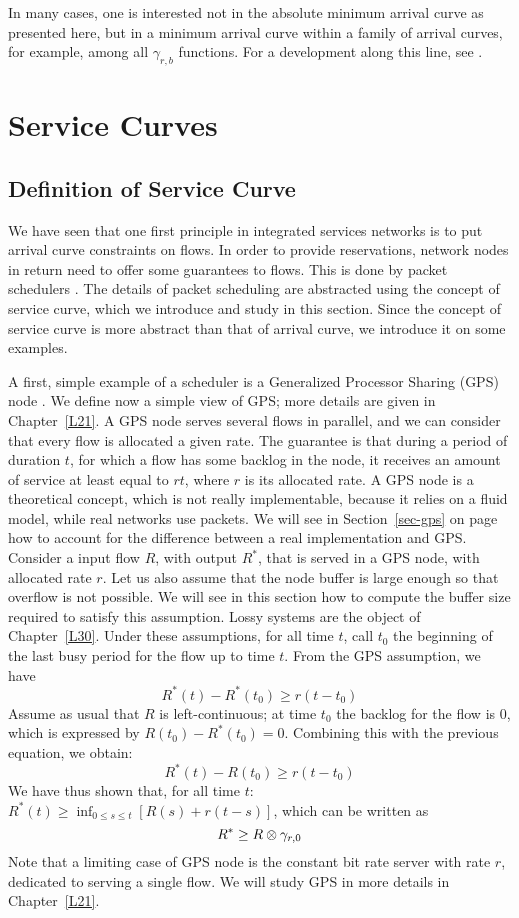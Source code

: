 In many cases, one is interested not in the absolute minimum
arrival curve as presented here, but in a minimum arrival curve
within a family of arrival curves, for example, among all
$\gamma_{r,b}$ functions. For a development along this line, see
\cite{naudts99}.


\section{Service Curves}
\subsection{Definition of Service Curve}
 We have seen that one first principle in
integrated services networks is to put arrival curve constraints
on flows. In order to provide reservations, network nodes in
return need to offer some guarantees to flows. This is done by
packet schedulers \cite{keshav-96}. The details of packet
scheduling are abstracted using the concept of service curve,
which we introduce and study in this section. Since the concept of
service curve is more abstract than that of arrival curve, we
introduce it on some examples.

A first, simple example of a scheduler is a Generalized Processor
Sharing (GPS) node \cite{pg93}. We define now a simple view of GPS; more details are
given in Chapter~\ref{L21}. A GPS node serves several flows in
parallel, and we can consider that every flow is allocated a given
rate. The guarantee is that during a period of duration $t$,  for
which a flow has some backlog in the node, it receives an amount
of service at least equal to $r t$, where $r$ is its allocated
rate. A GPS node is a theoretical concept, which is not really
implementable, because it relies on a fluid model, while real
networks use packets. We will see in Section~\ref{sec-gps} on
page~\pageref{sec-gps} how to account for the difference between a
real implementation and GPS. Consider a input flow $R$, with
output $R^*$, that is served in a GPS node, with allocated rate
$r$. Let us also assume that the node buffer is large enough so
that overflow is not possible. We will see in this section how to
compute the buffer size required to satisfy this assumption. Lossy
systems are the object of Chapter~\ref{L30}. Under these
assumptions, for all time $t$, call $t_0$ the beginning of the
last busy period for the flow up to time $t$. From the GPS
assumption, we have
$$R^{*}(t)-R^{*}(t_{0})\geq r(t-t_{0})$$
Assume as usual that $R$ is left-continuous; at time $t_0$ the
backlog for the flow is $0$, which is expressed by $R(t_0) -
R^*(t_0)=0$. Combining this with the previous equation, we obtain:
$$R^{*}(t)-R(t_{0})\geq r(t-t_{0}) $$
We have thus shown that, for all time $t$: $R^{*}(t) \geq
\inf_{0\leq s \leq t} [R(s) + r(t-s)]$, which can be written as
\begin{equation}\mylabel{eq-gps}
  R^{*} \geq R\mpc \gamma_{r,0}
\end{equation}
Note that a limiting case of GPS node is the constant bit rate
server with rate $r$, dedicated to serving a single flow. We will
study GPS in more details in Chapter~\ref{L21}.

